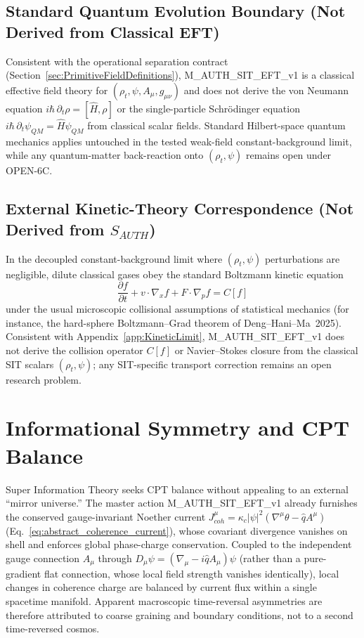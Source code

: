 \documentclass[american,11pt,letterpaper]{article}
\def\mathbf#1{#1}%
\def\mathrm#1{#1}%
\def\texttt#1{#1}%
\def\emph#1{#1}%
\begin{document}
\subsection{Standard Quantum Evolution Boundary (Not Derived from Classical EFT)}

Consistent with the operational separation contract (Section~\ref{sec:PrimitiveFieldDefinitions}), \texttt{M\_AUTH\_SIT\_EFT\_v1} is a classical effective field theory for $(\rho_t, \psi, A_\mu, g_{\mu\nu})$ and does \emph{not} derive the von Neumann equation $i\hbar\,\partial_t\rho = [\hat{H}, \rho]$ or the single-particle Schr\"odinger equation $i\hbar\,\partial_t\psi_{\mathrm{QM}} = \hat{H}\psi_{\mathrm{QM}}$ from classical scalar fields. Standard Hilbert-space quantum mechanics applies untouched in the tested weak-field constant-background limit, while any quantum-matter back-reaction onto $(\rho_t, \psi)$ remains open under \texttt{OPEN-6C}.

\subsection{External Kinetic-Theory Correspondence (Not Derived from $S_{\mathrm{AUTH}}$)}

In the decoupled constant-background limit where $(\rho_t, \psi)$ perturbations are negligible, dilute classical gases obey the standard Boltzmann kinetic equation
\[
\frac{\partial f}{\partial t} + \mathbf{v} \cdot \nabla_x f + \mathbf{F} \cdot \nabla_p f = C[f]
\]
under the usual microscopic collisional assumptions of statistical mechanics (for instance, the hard-sphere Boltzmann--Grad theorem of Deng--Hani--Ma~2025). Consistent with Appendix~\ref{app:KineticLimit}, \texttt{M\_AUTH\_SIT\_EFT\_v1} does \emph{not} derive the collision operator $C[f]$ or Navier--Stokes closure from the classical SIT scalars $(\rho_t, \psi)$; any SIT-specific transport correction remains an open research problem.

\section{Informational Symmetry and CPT Balance}
\label{sec:CPT-balance}

Super Information Theory seeks CPT balance without appealing to an external ``mirror universe.''  
The master action \texttt{M\_AUTH\_SIT\_EFT\_v1} already furnishes the conserved gauge-invariant Noether current
$J^\mu_{\mathrm{coh}} = \kappa_c|\psi|^2(\nabla^\mu\theta - \hat{q}A^\mu)$ (Eq.~\eqref{eq:abstract_coherence_current}),
whose covariant divergence vanishes on shell and enforces global phase-charge conservation.  
Coupled to the independent gauge connection $A_\mu$ through $D_\mu\psi = (\nabla_\mu - i\hat{q}A_\mu)\psi$ (rather than a pure-gradient flat connection, whose local field strength vanishes identically), local changes in coherence charge are balanced by current flux within a single spacetime manifold.  
Apparent macroscopic time-reversal asymmetries are therefore attributed to coarse graining and boundary conditions,
not to a second time-reversed cosmos.  
\end{document}
